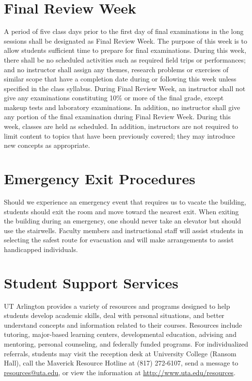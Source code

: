 \documentclass[10pt]{article}
\begin{document}
\section*{Final Review Week}
\label{sec:orgheadline16}
A period of five class days prior to the first day of final examinations in the long
sessions shall be designated as Final Review Week. The purpose of this week is to allow students sufficient
time to prepare for final examinations. During this week, there shall be no scheduled activities such as required
field trips or performances; and no instructor shall assign any themes, research problems or exercises of similar
scope that have a completion date during or following this week unless specified in the class syllabus. During
Final Review Week, an instructor shall not give any examinations constituting 10\% or more of the final grade,
except makeup tests and laboratory examinations. In addition, no instructor shall give any portion of the final
examination during Final Review Week. During this week, classes are held as scheduled. In addition,
instructors are not required to limit content to topics that have been previously covered; they may introduce
new concepts as appropriate.
\section*{Emergency Exit Procedures}
\label{sec:orgheadline17}
Should we experience an emergency event that requires us to vacate the
building, students should exit the room and move toward the nearest exit. When exiting the building during an
emergency, one should never take an elevator but should use the stairwells. Faculty members and instructional
staff will assist students in selecting the safest route for evacuation and will make arrangements to assist
handicapped individuals.
\section*{Student Support Services}
\label{sec:orgheadline18}
UT Arlington provides a variety of resources and programs designed to help
students develop academic skills, deal with personal situations, and better understand concepts and information
related to their courses. Resources include tutoring, major-based learning centers, developmental education,
advising and mentoring, personal counseling, and federally funded programs. For individualized referrals,
students may visit the reception desk at University College (Ransom Hall), call the Maverick Resource Hotline
at (817) 272-6107, send a message to \href{mailto:resources@uta.edu}{resources@uta.edu}, or view the information at \href{http://www.uta.edu/resources}{\url{http://www.uta.edu/resources}}.
\end{document}
